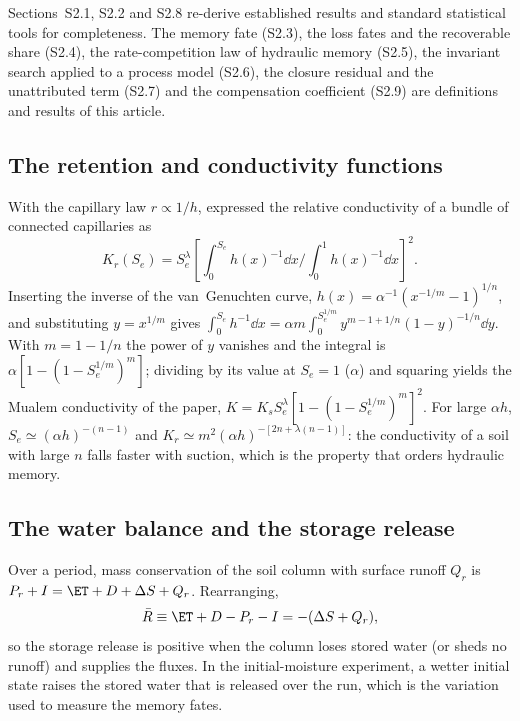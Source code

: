 Sections~S2.1, S2.2 and S2.8 re-derive established results \citep{vanGenuchten1980,Mualem1976} and standard statistical tools for completeness. The memory fate (S2.3), the loss fates and the recoverable share (S2.4), the rate-competition law of hydraulic memory (S2.5), the invariant search applied to a process model (S2.6), the closure residual and the unattributed term (S2.7) and the compensation coefficient (S2.9) are definitions and results of this article.

\subsection{The retention and conductivity functions}
With the capillary law $r\propto1/h$, \citet{Mualem1976} expressed the relative conductivity of a bundle of connected capillaries as
\begin{equation}K_r(S_e)=S_e^{\lambda}\left[\int_0^{S_e}h(x)^{-1}\dd x\Big/\int_0^{1}h(x)^{-1}\dd x\right]^{2}.\end{equation}
Inserting the inverse of the van~Genuchten curve, $h(x)=\alpha^{-1}(x^{-1/m}-1)^{1/n}$, and substituting $y=x^{1/m}$ gives $\int_0^{S_e}h^{-1}\dd x=\alpha m\int_0^{S_e^{1/m}}y^{m-1+1/n}(1-y)^{-1/n}\dd y$. With $m=1-1/n$ the power of $y$ vanishes and the integral is $\alpha[1-(1-S_e^{1/m})^m]$; dividing by its value at $S_e=1$ ($\alpha$) and squaring yields the Mualem conductivity of the paper, $K=K_sS_e^{\lambda}[1-(1-S_e^{1/m})^m]^2$. For large $\alpha h$, $S_e\simeq(\alpha h)^{-(n-1)}$ and $K_r\simeq m^2(\alpha h)^{-[2n+\lambda(n-1)]}$: the conductivity of a soil with large $n$ falls faster with suction, which is the property that orders hydraulic memory.

\subsection{The water balance and the storage release}
Over a period, mass conservation of the soil column with surface runoff $Q_r$ is $P_r+I=\ET+D+\Delta S+Q_r$. Rearranging,
\begin{equation}\bar R\equiv\ET+D-P_r-I=-(\Delta S+Q_r),\end{equation}
so the storage release is positive when the column loses stored water (or sheds no runoff) and supplies the fluxes. In the initial-moisture experiment, a wetter initial state raises the stored water that is released over the run, which is the variation used to measure the memory fates.


